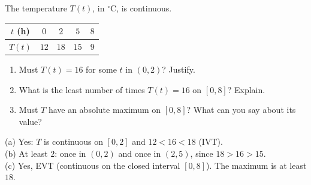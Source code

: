 \begin{exo}{}
The temperature $T(t)$, in $^\circ$C, is continuous. \;\begin{tabular}{|c|c|c|c|c|}\hline$t$ (h)&$0$&$2$&$5$&$8$\\\hline$T(t)$&$12$&$18$&$15$&$9$\\\hline\end{tabular}
\begin{enumerate}[label=(\alph*)]
\item Must $T(t)=16$ for some $t$ in $(0,2)$? Justify.
\item What is the least number of times $T(t)=16$ on $[0,8]$? Explain.
\item Must $T$ have an absolute maximum on $[0,8]$? What can you say about its value?
\end{enumerate}
\work{4cm}
\begin{solution}
(a) Yes: $T$ is continuous on $[0,2]$ and $12<16<18$ (IVT).\\
(b) At least $2$: once in $(0,2)$ and once in $(2,5)$, since $18>16>15$.\\
(c) Yes, EVT (continuous on the closed interval $[0,8]$). The maximum is at least $18$.
\end{solution}
\end{exo}

